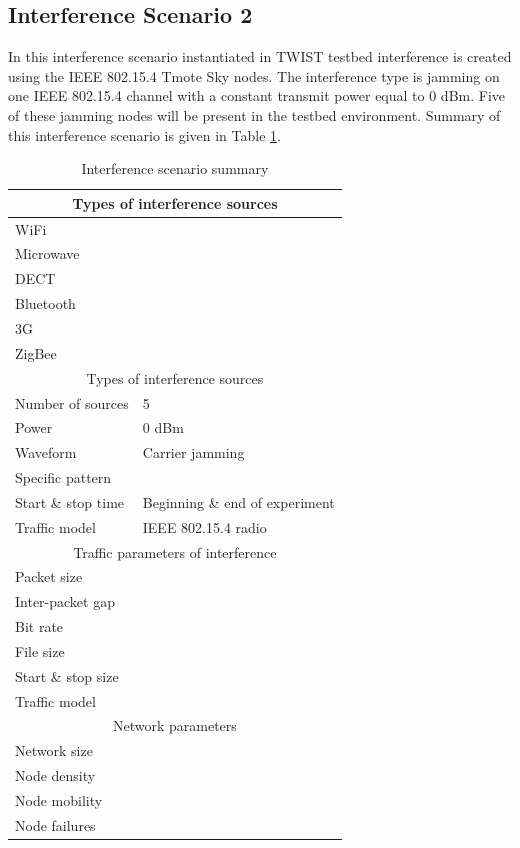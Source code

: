\documentclass[11pt,a4paper,headinclude,footinclude,chapterprefix=on]{scrreprt}
\begin{document}
\subsection{Interference Scenario 2}In this interference scenario instantiated in TWIST testbed interference is created using the IEEE 802.15.4 Tmote Sky nodes. The interference type is jamming on one IEEE 802.15.4 channel with a constant transmit power equal to 0 dBm. Five of these jamming nodes will be present in the testbed environment. Summary of this interference scenario is given in Table \ref{tb:interf:2}.
\begin{table}
	[h] \centering \caption{Interference scenario summary} \label{tb:interf:2} 
	\begin{tabular}
		{|l|l|} \hline \multicolumn{2}{|c|}{Types of interference sources} \\
		\hline WiFi & \texttimes \\
		Microwave & \texttimes \\
		DECT & \texttimes \\
		Bluetooth & \texttimes \\
		3G & \texttimes \\
		ZigBee & \checkmark \\
		\hline \multicolumn{2}{|c|}{Types of interference sources} \\
		\hline Number of sources & 5 \\
		Power & 0 dBm \\
		Waveform & Carrier jamming \\
		Specific pattern & \\
		Start \& stop time & Beginning \& end of experiment \\
		Traffic model & IEEE 802.15.4 radio \\
		\hline \multicolumn{2}{|c|}{Traffic parameters of interference} \\
		\hline Packet size & \\
		Inter-packet gap & \\
		Bit rate & \\
		File size & \\
		Start \& stop size & \\
		Traffic model & \\
		\hline \multicolumn{2}{|c|}{Network parameters} \\
		\hline Network size & \\
		Node density & \\
		Node mobility & \\
		Node failures & \\
		\hline 
	\end{tabular}
\end{table}
\end{document}
